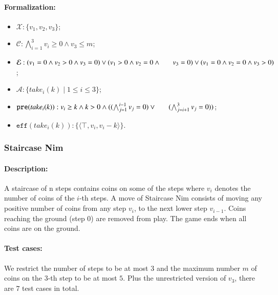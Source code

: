 \documentclass[review]{elsarticle}
\newcommand{\set}[1]{\{ #1 \}}
\newcommand{\tuple}[1]{\langle {#1} \rangle}
\newcommand{\true}{\top}
\newcommand{\statevar}{\mathcal{X}}
\newcommand{\act}{\mathcal{A}}
\newcommand{\constraint}{\mathcal{C}}
\newcommand{\estate}{\mathcal{E}}
\newcommand{\pre}{\mathtt{pre}}
\newcommand{\eff}{\mathtt{eff}}
\begin{document}
\paragraph{Formalization:}
\begin{itemize}
	\item $\statevar: \set{v_1, v_2 ,v_3}$;
	\item $\constraint:\bigwedge_{i=1}^{3} v_i \ge 0 \wedge v_3 \le m$;
	\item $\estate: (v_1 = 0  \wedge v_2 > 0 \wedge  v_3 = 0)\vee (v_1 > 0  \wedge v_2 = 0  \wedge \\ \hspace*{6mm} v_3 = 0)\vee(v_1 = 0  \wedge v_2 = 0 \wedge  v_3 > 0)$;
	\item $\act:\set{take_i(k) {\mid} 1 \le i \le 3}$;
	\item $\pre(take_i(k)) : v_i \ge k \wedge k > 0 \wedge ((\bigwedge_{j=1}^{i-1} v_j = 0 )\vee \\ \hspace*{6mm}
	(\bigwedge_{j=i+1}^{3} v_j = 0))$;
	\item $\eff(take_i(k)) : \set{\tuple{\true,v_i,v_i -k}}$.
\end{itemize}

\subsubsection{Staircase Nim \protect\cite{Spr1937}}

\paragraph{Description:} 
A staircase of n steps contains coins on some of the steps where $v_i$ denotes the number of coins of the $i$-th steps.
A move of Staircase Nim consists of moving any positive number of coins from any step $v_i$, to the next lower step $v_{i-1}$. 
Coins reaching the ground (step 0) are removed from play. 
The game ends when all coins are on the ground. 

\paragraph{Test cases:}
We restrict the number of steps to be at most $3$ and the maximum number $m$ of coins on the $3$-th step to be at most $5$.
Plus the unrestricted version of $v_3$, there are $7$ test cases in total.
\end{document}

